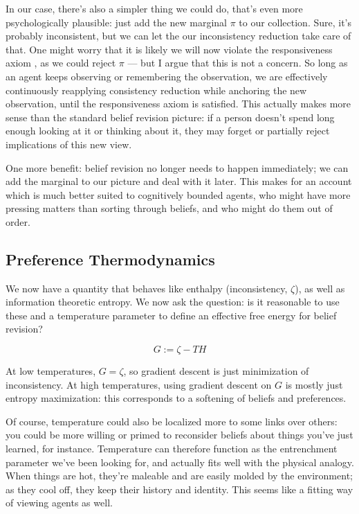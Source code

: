 \documentclass{article}
\begin{document}
	In our case, there's also a simpler thing we could do, that's even more psychologically plausible: just add the new marginal $\pi$ to our collection. Sure, it's probably inconsistent, but we can let the our inconsistency reduction take care of that. One might worry that it is likely we will now violate the responsiveness axiom \cite{dietrich2016belief}, as we could reject $\pi$ --- but I argue that this is not a concern. So long as an agent keeps observing or remembering the observation, we are effectively continuously reapplying consistency reduction while anchoring the new observation, until the responsiveness axiom is satisfied. This actually makes more sense than the standard belief revision picture: if a person doesn't spend long enough looking at it or thinking about it, they may forget or partially reject implications of this new view.
	
	
	One more benefit: belief revision no longer needs to happen immediately; we can add the marginal to our picture and deal with it later. This makes for an account which is much better suited to cognitively bounded agents, who might have more pressing matters than sorting through beliefs, and who might do them out of order.
	
	\subsection{Preference Thermodynamics} \label{sec:thermo}
	We now have a quantity that behaves like enthalpy (inconsistency, $\zeta$), as well as information theoretic entropy. We now ask the question: is it reasonable to use these and a temperature parameter to define an effective free energy for belief revision?
	
	\[ G := \zeta - T H \]
	

	At low temperatures, $G = \zeta$, so gradient descent is just minimization of inconsistency. At high temperatures, using gradient descent on $G$ is mostly just entropy maximization: this corresponds to a softening of beliefs and preferences. 
	
	Of course, temperature could also be localized more to some links over others: you could be more willing or primed to reconsider beliefs about things you've just learned, for instance. Temperature can therefore function as the entrenchment parameter we've been looking for, and actually fits well with the physical analogy. When things are hot, they're maleable and are easily molded by the environment; as they cool off, they keep their history and identity. This seems like a fitting way of viewing agents as well.
	
\end{document}
